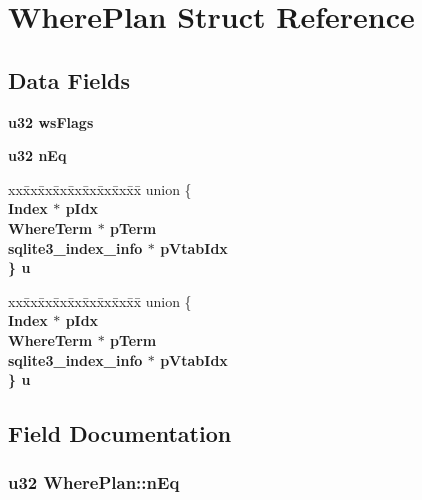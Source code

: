 \section{Where\-Plan Struct Reference}
\label{structWherePlan}
\subsection*{Data Fields}
\begin{CompactItemize}
\item 
\bf{u32} \bf{ws\-Flags}
\item 
\bf{u32} \bf{n\-Eq}
\item 
\begin{tabbing}
xx\=xx\=xx\=xx\=xx\=xx\=xx\=xx\=xx\=\kill
union \{\\
\>\bf{Index} $\ast$ \bf{pIdx}\\
\>\bf{WhereTerm} $\ast$ \bf{pTerm}\\
\>\bf{sqlite3\_index\_info} $\ast$ \bf{pVtabIdx}\\
\} \bf{u}\\

\end{tabbing}\item 
\begin{tabbing}
xx\=xx\=xx\=xx\=xx\=xx\=xx\=xx\=xx\=\kill
union \{\\
\>\bf{Index} $\ast$ \bf{pIdx}\\
\>\bf{WhereTerm} $\ast$ \bf{pTerm}\\
\>\bf{sqlite3\_index\_info} $\ast$ \bf{pVtabIdx}\\
\} \bf{u}\\

\end{tabbing}\end{CompactItemize}


\subsection{Field Documentation}
\subsubsection{\setlength{\rightskip}{0pt plus 5cm}\bf{u32} \bf{Where\-Plan::n\-Eq}}\label{structWherePlan_a024c85c680262cdeb1c2c7c4cd4a3f4}


